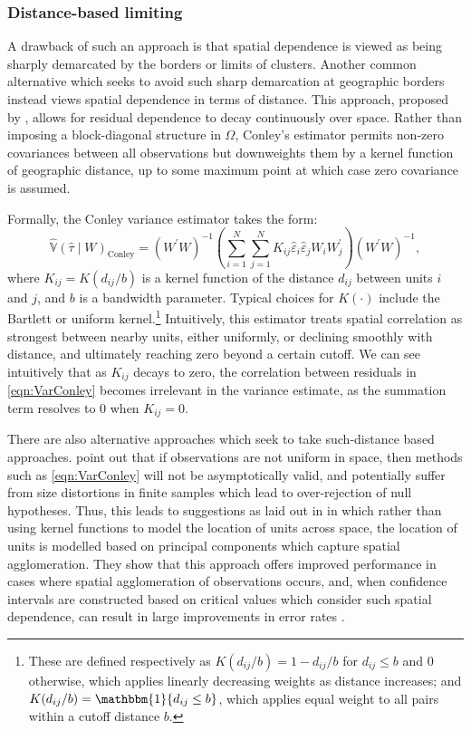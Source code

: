 \documentclass[varwidth,bib]{statapress}
\begin{document}
\subsubsection{Distance-based limiting}
A drawback of such an approach is that spatial dependence is viewed as being sharply demarcated by the borders or limits of clusters.  Another common alternative which seeks to avoid such sharp demarcation at geographic borders instead views spatial dependence in terms of distance.  This approach, proposed by \citet{Conley1999}, allows for residual dependence to decay continuously over space. Rather than imposing a block-diagonal structure in $\Omega$, Conley's estimator permits non-zero covariances between all observations but downweights them by a kernel function of geographic distance, up to some maximum point at which case zero covariance is assumed.

Formally, the Conley variance estimator takes the form:
\begin{equation}
\label{eqn:VarConley}
\widehat{\mathbb{V}}(\widehat\tau \mid W)_{\text{Conley}} = (W^\prime W)^{-1} \left( \sum_{i=1}^N \sum_{j=1}^N K_{ij} \widehat\varepsilon_i \widehat\varepsilon_j W_i W_j^\prime \right) (W^\prime W)^{-1},
\end{equation}
where $K_{ij}=K(d_{ij}/b)$ is a kernel function of the distance $d_{ij}$ between units $i$ and $j$, and $b$ is a bandwidth parameter. Typical choices for $K(\cdot)$ include the Bartlett or uniform kernel.\footnote{These are defined respectively as $K(d_{ij}/b) = 1 - d_{ij}/b$ for $d_{ij} \leq b$ and $0$ otherwise, which applies linearly decreasing weights as distance increases; and $K(d_{ij}/b) = \mathbbm{1}\{d_{ij} \leq b\}$, which applies equal weight to all pairs within a cutoff distance $b$.} Intuitively, this estimator treats spatial correlation as strongest between nearby units, either uniformly, or declining smoothly with distance, and ultimately reaching zero beyond a certain cutoff.  We can see intuitively that as $K_{ij}$ decays to zero, the correlation between residuals in \eqref{eqn:VarConley} becomes irrelevant in the variance estimate, as the summation term resolves to 0 when $K_{ij}=0$.

There are also alternative approaches which seek to take such-distance based approaches.  \citet{MullerWatson2022} point out that if observations are not uniform in space, then methods such as \eqref{eqn:VarConley} will not be asymptotically valid, and potentially suffer from size distortions in finite samples which lead to over-rejection of null hypotheses.  Thus, this leads to suggestions as laid out in  \citet{MullerWatson2022,MullerWatson2023} in which rather than using kernel functions to model the location of units across space, the location of units is modelled based on principal components which capture spatial agglomeration.  They show that this approach offers improved performance in cases where spatial agglomeration of observations occurs, and, when confidence intervals are constructed based on critical values which consider such spatial dependence, can result in large improvements in error rates \citep{MullerWatson2023}.
\end{document}
